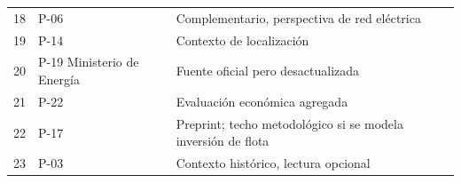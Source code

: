 \documentclass[11pt,a4paper,parskip=half]{scrartcl}
\begin{document}
\begin{longtable}{@{}p{0.7cm}p{6cm}p{8.5cm}@{}}
18 & P-06 \citet{pasha_evsstateofart_2024} & Complementario, perspectiva de red eléctrica \\
19 & P-14 \citet{xylia_stockholmlocation_2017} & Contexto de localización \\
20 & P-19 Ministerio de Energía & Fuente oficial pero desactualizada \\
21 & P-22 \citet{oemick_economicsocialeval_2019} & Evaluación económica agregada \\
22 & P-17 \citet{legault_bendersfleetelectrification_2025} & Preprint; techo metodológico si se modela inversión de flota \\
23 & P-03 \citet{desaulniers_publictransit_2007} & Contexto histórico, lectura opcional \\
\bottomrule
\end{longtable}

\clearpage
\renewcommand{\refname}{Referencias citadas}

\end{document}

